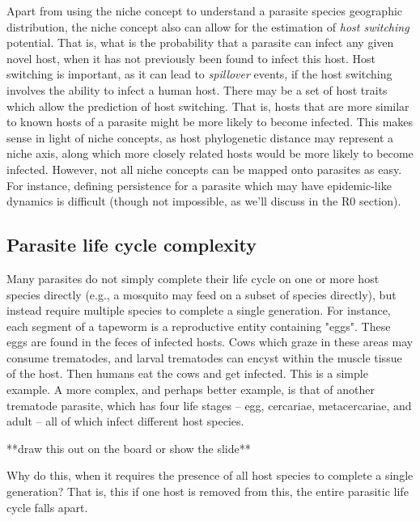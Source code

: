 \documentclass[12pt]{article}
\begin{document}
Apart from using the niche concept to understand a parasite species geographic distribution, the niche concept also can allow for the estimation of \textit{host switching} potential. That is, what is the probability that a parasite can infect any given novel host, when it has not previously been found to infect this host. Host switching is important, as it can lead to \textit{spillover} events, if the host switching involves the ability to infect a human host. There may be a set of host traits which allow the prediction of host switching. That is, hosts that are more similar to known hosts of a parasite might be more likely to become infected. This makes sense in light of niche concepts, as host phylogenetic distance may represent a niche axis, along which more closely related hosts would be more likely to become infected. However, not all niche concepts can be mapped onto parasites as easy. For instance, defining persistence for a parasite which may have epidemic-like dynamics is difficult (though not impossible, as we'll discuss in the R0 section). 







\bigskip
\subsection*{Parasite life cycle complexity}

Many parasites do not simply complete their life cycle on one or more host species directly (e.g., a mosquito may feed on a subset of species directly), but instead require multiple species to complete a single generation. For instance, each segment of a tapeworm is a reproductive entity containing "eggs". These eggs are found in the feces of infected hosts. Cows which graze in these areas may consume trematodes, and larval trematodes can encyst within the muscle tissue of the host. Then humans eat the cows and get infected. This is a simple example. A more complex, and perhaps better example, is that of another trematode parasite, which has four life stages -- egg, cercariae, metacercariae, and adult -- all of which infect different host species. 


**draw this out on the board or show the slide**




Why do this, when it requires the presence of all host species to complete a single generation? That is, this if one host is removed from this, the entire parasitic life cycle falls apart. 
\end{document}
